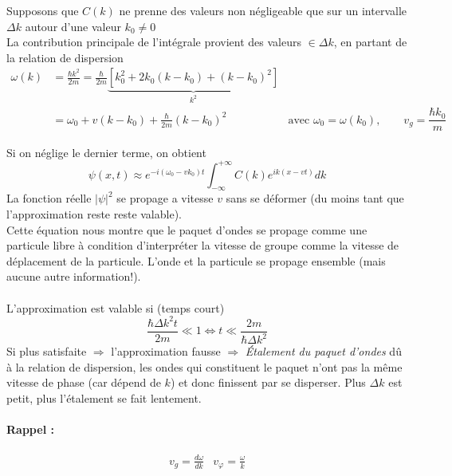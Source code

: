 \documentclass	[11pt, a4paper, openany]{book}
\begin{document}
	Supposons que $C(k)$ ne prenne des valeurs non négligeable que sur un intervalle $\Delta k$ autour d'une valeur $k_0\neq0$\\
	La contribution principale de l'intégrale provient des valeurs $\in\Delta k$, en partant de la relation de dispersion \begin{align}
	\omega(k) & =\frac{\hbar k^2}{2m}=\frac{\hbar}{2m}\underbrace{[k_0^2+2k_0(k-k_0)+(k-k_0)^2]}_{k^2}\\
	& =\omega_0+v(k-k_0)+\frac{\hbar}{2m}(k-k_0)^2 &\text{avec } \omega_0=\omega(k_0),\qquad v_g=\dfrac{\hbar k_0}{m}
	\end{align}
	
	Si on néglige le dernier terme, on obtient \begin{equation}\psi(x,t) \approx e^{-i(\omega_0-vk_0)t}\int^{+\infty}_{-\infty}C(k)e^{ik(x-vt)}dk
	\end{equation}
	La fonction réelle $|\psi|^2$ se propage a vitesse $v$ sans se déformer (du moins tant que l'approximation reste reste valable). \\
	Cette équation nous montre que le paquet d'ondes se propage comme une particule libre à condition d'interpréter la vitesse de groupe comme la vitesse de déplacement de la particule. L'onde et la particule se propage ensemble (mais aucune autre information!).\\\\
	L'approximation est valable si (temps court)
	\begin{equation}\frac{\hbar\Delta k^2t}{2m}\ll1\Leftrightarrow t\ll\frac{2m}{\hbar\Delta k^2}\end{equation}
	Si plus satisfaite $\Rightarrow$ l'approximation fausse $\Rightarrow$ \textit{Étalement du paquet d'ondes} dû à la relation de dispersion, les ondes qui constituent le paquet n'ont pas la même vitesse de phase (car dépend de $k$) et donc finissent par se disperser. Plus $\Delta k$ est petit, plus l'étalement se fait lentement.
	\paragraph{Rappel :}
	\begin{equation}
		\begin{array}{cc}
			v_g=\frac{d\omega}{dk} & v_{\varphi}=\frac{\omega}{k} 
		\end{array}{}
	\end{equation}
\end{document}
